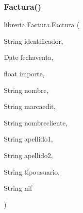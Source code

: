 \subsubsection{\texorpdfstring{Factura()}{Factura()}}
{\footnotesize\ttfamily libreria.\+Factura.\+Factura (\begin{DoxyParamCaption}\item[{String}]{identificador,  }\item[{Date}]{fechaventa,  }\item[{float}]{importe,  }\item[{String}]{nombre,  }\item[{String}]{marcaedit,  }\item[{String}]{nombrecliente,  }\item[{String}]{apellido1,  }\item[{String}]{apellido2,  }\item[{String}]{tipousuario,  }\item[{String}]{nif }\end{DoxyParamCaption})\hspace{0.3cm}{\ttfamily [inline]}}


